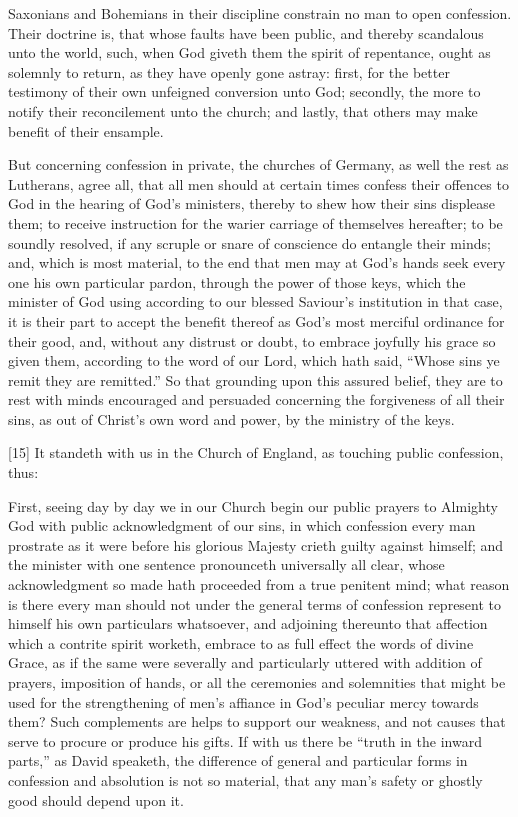 Saxonians and Bohemians in their discipline constrain no man to open confession. Their doctrine is, that whose faults have been public, and thereby scandalous unto the world, such, when God giveth them the spirit of repentance, ought as solemnly to return, as they have openly gone astray: first, for the better testimony of their own unfeigned conversion unto God; secondly, the more to notify their reconcilement unto the church; and lastly, that others may make benefit of their ensample.

But concerning confession in private, the churches of Germany, as well the rest as Lutherans, agree all, that all  men should at certain times confess their offences to God in the hearing of God’s ministers, thereby to shew how their sins displease them; to receive instruction for the warier carriage of themselves hereafter; to be soundly resolved, if any scruple or snare of conscience do entangle their minds; and, which is most material, to the end that men may at God’s hands seek every one his own particular pardon, through the power of those keys, which the minister of God using according to our blessed Saviour’s institution in that case, it is their part to accept the benefit thereof as God’s most merciful ordinance for their good, and, without any distrust or doubt, to embrace joyfully his grace so given them, according to the word of our Lord, which hath said, “Whose sins ye remit they are remitted.” So that grounding upon this assured belief, they are to rest with minds encouraged and persuaded concerning the forgiveness of all their sins, as out of Christ’s own word and power, by the ministry of the keys.

[15] It standeth with us in the Church of England, as touching public confession, thus:

First, seeing day by day we in our Church begin our public prayers to Almighty God with public acknowledgment of our sins, in which confession every man prostrate as it were before his glorious Majesty crieth guilty against himself; and the minister with one sentence pronounceth universally all clear, whose acknowledgment so made hath proceeded from a true penitent mind; what reason is there every man should not under the general terms of confession represent to himself  his own particulars whatsoever, and adjoining thereunto that affection which a contrite spirit worketh, embrace to as full effect the words of divine Grace, as if the same were severally and particularly uttered with addition of prayers, imposition of hands, or all the ceremonies and solemnities that might be used for the strengthening of men’s affiance in God’s peculiar mercy towards them? Such complements are helps to support our weakness, and not causes that serve to procure or produce his gifts. If with us there be “truth in the inward parts,” as David speaketh, the difference of general and particular forms in confession and absolution is not so material, that any man’s safety or ghostly good should depend upon it.

